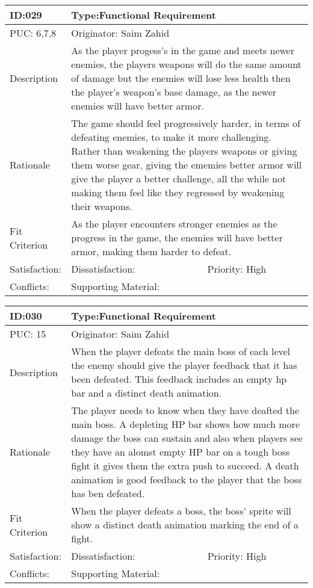 \documentclass{article}
\begin{document}
	\begin{table}[H]
		\begin{tabular}{|l|l|l|}
			\hline
			ID:029 & \multicolumn{2}{l|}{Type:Functional Requirement} \\ \hline
			PUC: 6,7,8 & \multicolumn{2}{l|}{Originator: Saim Zahid} \\ \hline
			Description & \multicolumn{2}{m{0.85\textwidth}|}{As the player progess's in the game and meets newer enemies, the players weapons will do the same amount of damage but the enemies will lose less health then the player's weapon's base damage, as the newer enemies will have better armor.} \\ \hline
			Rationale & \multicolumn{2}{m{0.85\textwidth}|}{The game should feel progressively harder, in terms of defeating enemies, to make it more challenging. Rather than weakening the players weapons or giving them worse gear, giving the ememies better armor will give the player a better challenge, all the while not making them feel like they regressed by weakening their weapons.} \\ \hline
			Fit Criterion & \multicolumn{2}{m{0.85\textwidth}|}{As the player encounters stronger enemies as the progress in the game, the enemies will have better armor, making them harder to defeat.} \\ \hline
			Satisfaction: & Dissatisfaction: & Priority: High\\ \hline
			Conflicts: & \multicolumn{2}{l|}{Supporting Material:} \\ \hline
		\end{tabular}
	\end{table}

	\begin{table}[H]
		\begin{tabular}{|l|l|l|}
			\hline
			ID:030 & \multicolumn{2}{l|}{Type:Functional Requirement} \\ \hline
			PUC: 15 & \multicolumn{2}{l|}{Originator: Saim Zahid} \\ \hline
			Description & \multicolumn{2}{m{0.85\textwidth}|}{When the player defeats the main boss of each level the enemy should give the player feedback that it has been defeated. This feedback includes an empty hp bar and a distinct death animation.} \\ \hline
			Rationale & \multicolumn{2}{m{0.85\textwidth}|}{The player needs to know when they have deafted the main boss. A depleting HP bar shows how much more damage the boss can sustain and also when players see they have an alomst empty HP bar on a tough boss fight it gives them the extra push to succeed. A death animation is good feedback to the player that the boss has ben defeated.} \\ \hline
			Fit Criterion & \multicolumn{2}{m{0.85\textwidth}|}{When the player defeats a boss, the boss' sprite will show a distinct death animation marking the end of a fight.} \\ \hline
			Satisfaction: & Dissatisfaction: & Priority: High\\ \hline
			Conflicts: & \multicolumn{2}{l|}{Supporting Material:} \\ \hline
		\end{tabular}
	\end{table}
\end{document}
